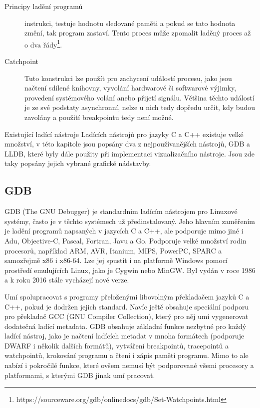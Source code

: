 \documentclass[bc,male,python,dept460]{diploma}						%
\begin{document}
\begin{section}{Principy ladění programů}
\begin{description}
				instrukci, testuje hodnotu sledované paměti a pokud se tato hodnota změní, tak program zastaví. Tento proces může zpomalit laděný proces až o
				dva řády\footnote{https://sourceware.org/gdb/onlinedocs/gdb/Set-Watchpoints.html}.
			\item[Catchpoint]
				Tuto konstrukci lze použít pro zachycení událostí procesu, jako jsou načtení sdílené knihovny, vyvolání hardwarové či softwarové výjimky, provedení
				systémového volání anebo přijetí signálu. Většina těchto událostí je ze své podstaty asynchronní, nelze u nich tedy dopředu určit, kdy budou zavolány
				a použití breakpointu tedy není možné.
		\end{description}
\end{section}
\begin{section}{Existující ladící nástroje}
\label{sec:ExistingDebuggers}
	Ladících nástrojů pro jazyky C a C++ existuje velké množství, v této kapitole jsou popsány dva z nejpoužívanějších nástrojů, GDB a LLDB, které byly dále
	použity při implementaci vizualizačního nástroje. Jsou zde taky popsány jejich vybrané grafické nádstavby.

	\subsection{GDB}
		GDB (The GNU Debugger) je standardním ladícím nástrojem pro Linuxové systémy, často je v těchto systémech už předinstalovaný.
		Jeho hlavním zaměřením je ladění programů napsaných v jazycích C a C++, ale podporuje mimo jiné i Adu, Objective-C, Pascal, Fortran, Javu
		a Go\cite{gdb-languages}. Podporuje velké množství rodin procesorů, například ARM, AVR, Itanium, MIPS, PowerPC, SPARC a samozřejmě x86 i x86-64.
		Lze jej spustit i na platformě Windows pomocí prostředí emulujících Linux, jako je Cygwin nebo MinGW. Byl vydán v roce 1986 a k roku
		2016 stále vycházejí nové verze.
		
		\par Umí spolupracovat s programy přeloženými libovolným překladačem jazyků C a C++, pokud je dodržen jejich standard. Navíc ještě obsahuje
		speciální podporu pro překladač GCC (GNU Compiler Collection), který pro něj umí vygenerovat dodatečná ladící metadata.
		GDB obsahuje základní funkce nezbytné pro každý ladící nástroj, jako je načtení ladících metadat v mnoha formátech (podporuje DWARF i několik dalších
		formátů), vytváření breakpointů, tracepointů a watchpointů, krokování programu a čtení i zápis paměti programu.
		Mimo to ale nabízí i pokročilé funkce, které ovšem nemusí být podporované všemi procesory a platformami, s kterými GDB jinak umí pracovat.
		

\end{section}
\end{document}
